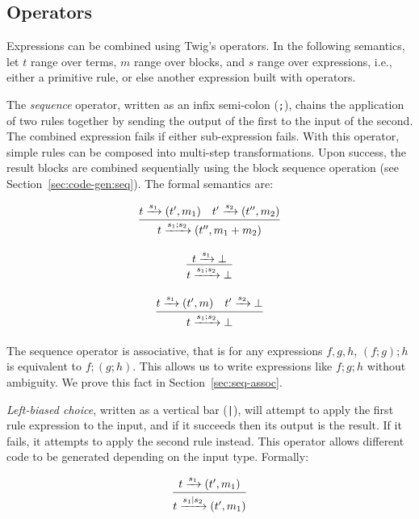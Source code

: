 
\subsection{Operators}
\label{sec:semantics:ops}

Expressions can be combined using Twig's operators. In the
following semantics, let $t$ range over terms, $m$ range over
blocks, and $s$ range over expressions, i.e., either a primitive
rule, or else another expression built with operators.

The \emph{sequence} operator, written as an infix semi-colon
(\texttt{;}), chains the application of two rules together by
sending the output of the first to the input of the second. The
combined expression fails if either sub-expression fails. With
this operator, simple rules can be composed into multi-step
transformations. Upon success, the result blocks are combined
sequentially using the block sequence operation (see
Section~\ref{sec:code-gen:seq}). The formal semantics are:

\begin{equation}
\label{S1}
\infer
  {t \arr{s_1;s_2} (t'',m_1+m_2)}
  {t \arr{s_1} (t',m_1) \quad t' \arr{s_2} (t'',m_2)}  
\end{equation}

\begin{equation}
\label{S2}
\infer
  {t \arr{s_1;s_2} \bot}
  {t \arr{s_1} \bot}  
\end{equation}

\begin{equation}
\label{S3}
\infer
  {t \arr{s_1;s_2} \bot}
  {t \arr{s_1} (t',m) \quad t' \arr{s_2} \bot}  
\end{equation}

The sequence operator is associative, that is for any expressions
$f,g,h$, $(f;g);h$ is equivalent to $f;(g;h)$. This allows us to
write expressions like $f;g;h$ without ambiguity. We prove this
fact in Section~\ref{sec:seq-assoc}.

\emph{Left-biased choice}, written as a vertical bar (\texttt{|}),
will attempt to apply the first rule expression to the input, and
if it succeeds then its output is the result. If it fails, it
attempts to apply the second rule instead. This operator allows
different code to be generated depending on the input type.
Formally:

\begin{equation}
\label{C1}
\infer
  {t \arr{s_1|s_2} (t',m_1)}
  {t \arr{s_1} (t',m_1)}
\end{equation}

